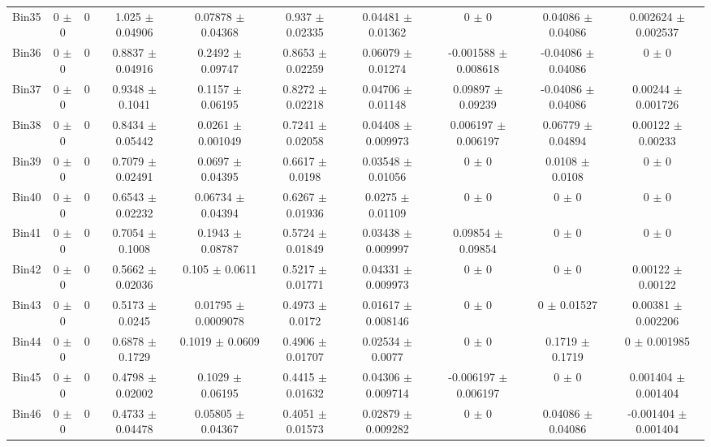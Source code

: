 \begin{tabular}{@{\extracolsep{4pt}}lccccccccc@{}}
     Bin35 & 0 $\pm$ 0 & 0 & 1.025 $\pm$ 0.04906 & 0.07878 $\pm$ 0.04368 & 0.937 $\pm$ 0.02335 & 0.04481 $\pm$ 0.01362 & 0 $\pm$ 0 & 0.04086 $\pm$ 0.04086 & 0.002624 $\pm$ 0.002537 \\ 
     Bin36 & 0 $\pm$ 0 & 0 & 0.8837 $\pm$ 0.04916 & 0.2492 $\pm$ 0.09747 & 0.8653 $\pm$ 0.02259 & 0.06079 $\pm$ 0.01274 & -0.001588 $\pm$ 0.008618 & -0.04086 $\pm$ 0.04086 & 0 $\pm$ 0 \\ 
     Bin37 & 0 $\pm$ 0 & 0 & 0.9348 $\pm$ 0.1041 & 0.1157 $\pm$ 0.06195 & 0.8272 $\pm$ 0.02218 & 0.04706 $\pm$ 0.01148 & 0.09897 $\pm$ 0.09239 & -0.04086 $\pm$ 0.04086 & 0.00244 $\pm$ 0.001726 \\ 
     Bin38 & 0 $\pm$ 0 & 0 & 0.8434 $\pm$ 0.05442 & 0.0261 $\pm$ 0.001049 & 0.7241 $\pm$ 0.02058 & 0.04408 $\pm$ 0.009973 & 0.006197 $\pm$ 0.006197 & 0.06779 $\pm$ 0.04894 & 0.00122 $\pm$ 0.00233 \\ 
     Bin39 & 0 $\pm$ 0 & 0 & 0.7079 $\pm$ 0.02491 & 0.0697 $\pm$ 0.04395 & 0.6617 $\pm$ 0.0198 & 0.03548 $\pm$ 0.01056 & 0 $\pm$ 0 & 0.0108 $\pm$ 0.0108 & 0 $\pm$ 0 \\ 
     Bin40 & 0 $\pm$ 0 & 0 & 0.6543 $\pm$ 0.02232 & 0.06734 $\pm$ 0.04394 & 0.6267 $\pm$ 0.01936 & 0.0275 $\pm$ 0.01109 & 0 $\pm$ 0 & 0 $\pm$ 0 & 0 $\pm$ 0 \\ 
     Bin41 & 0 $\pm$ 0 & 0 & 0.7054 $\pm$ 0.1008 & 0.1943 $\pm$ 0.08787 & 0.5724 $\pm$ 0.01849 & 0.03438 $\pm$ 0.009997 & 0.09854 $\pm$ 0.09854 & 0 $\pm$ 0 & 0 $\pm$ 0 \\ 
     Bin42 & 0 $\pm$ 0 & 0 & 0.5662 $\pm$ 0.02036 & 0.105 $\pm$ 0.0611 & 0.5217 $\pm$ 0.01771 & 0.04331 $\pm$ 0.009973 & 0 $\pm$ 0 & 0 $\pm$ 0 & 0.00122 $\pm$ 0.00122 \\ 
     Bin43 & 0 $\pm$ 0 & 0 & 0.5173 $\pm$ 0.0245 & 0.01795 $\pm$ 0.0009078 & 0.4973 $\pm$ 0.0172 & 0.01617 $\pm$ 0.008146 & 0 $\pm$ 0 & 0 $\pm$ 0.01527 & 0.00381 $\pm$ 0.002206 \\ 
     Bin44 & 0 $\pm$ 0 & 0 & 0.6878 $\pm$ 0.1729 & 0.1019 $\pm$ 0.0609 & 0.4906 $\pm$ 0.01707 & 0.02534 $\pm$ 0.0077 & 0 $\pm$ 0 & 0.1719 $\pm$ 0.1719 & 0 $\pm$ 0.001985 \\ 
     Bin45 & 0 $\pm$ 0 & 0 & 0.4798 $\pm$ 0.02002 & 0.1029 $\pm$ 0.06195 & 0.4415 $\pm$ 0.01632 & 0.04306 $\pm$ 0.009714 & -0.006197 $\pm$ 0.006197 & 0 $\pm$ 0 & 0.001404 $\pm$ 0.001404 \\ 
     Bin46 & 0 $\pm$ 0 & 0 & 0.4733 $\pm$ 0.04478 & 0.05805 $\pm$ 0.04367 & 0.4051 $\pm$ 0.01573 & 0.02879 $\pm$ 0.009282 & 0 $\pm$ 0 & 0.04086 $\pm$ 0.04086 & -0.001404 $\pm$ 0.001404 \\ 

\end{tabular}

